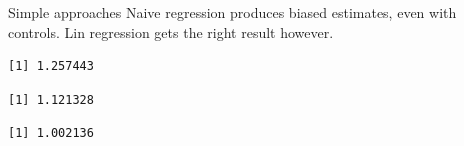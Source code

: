 \documentclass[
  11pt,
  ignorenonframetext,
]{beamer}
\newenvironment{Shaded}{\begin{snugshade}}{\end{snugshade}}
\newcommand{\AttributeTok}[1]{\textcolor[rgb]{0.40,0.45,0.13}{#1}}
\newcommand{\CommentTok}[1]{\textcolor[rgb]{0.37,0.37,0.37}{#1}}
\newcommand{\FunctionTok}[1]{\textcolor[rgb]{0.28,0.35,0.67}{#1}}
\newcommand{\NormalTok}[1]{\textcolor[rgb]{0.00,0.23,0.31}{#1}}
\newcommand{\SpecialCharTok}[1]{\textcolor[rgb]{0.37,0.37,0.37}{#1}}
\newcommand{\StringTok}[1]{\textcolor[rgb]{0.13,0.47,0.30}{#1}}
\begin{document}
\begin{frame}[fragile]{Simple approaches}
\protect\hypertarget{simple-approaches}{}
Naive regression produces biased estimates, even with controls. Lin
regression gets the right result however.

\begin{Shaded}
\end{Shaded}

\begin{verbatim}
[1] 1.257443
\end{verbatim}

\begin{Shaded}
\end{Shaded}

\begin{verbatim}
[1] 1.121328
\end{verbatim}

\begin{Shaded}
\end{Shaded}

\begin{verbatim}
[1] 1.002136
\end{verbatim}
\end{frame}
\end{document}
